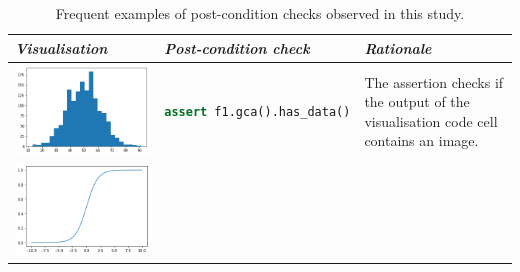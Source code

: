 \documentclass[conference]{IEEEtran}
\begin{document}
\begin{table}
\centering
\caption{Frequent examples of post-condition checks observed in this study.}
  \begin{tabular}{@{}m{} m{} m{}@{}}
\toprule
\emph{\textbf{Visualisation}}&
\emph{\textbf{Post-condition check}}&
\emph{\textbf{Rationale}}\\
\midrule
\includegraphics[width=\linewidth]{post-cond-01.png}&
\begin{lstlisting}[language=Python,belowskip=0pt,aboveskip=0pt]
assert f1.gca().has_data()
\end{lstlisting}&
The assertion checks if the output of the visualisation code cell contains an image.\\
\includegraphics[width=\linewidth]{post-cond-02.png}&
\begin{lstlisting}[language=Python,belowskip=0pt,aboveskip=0pt]

\end{lstlisting}
\end{tabular}
\end{table}
\end{document}
